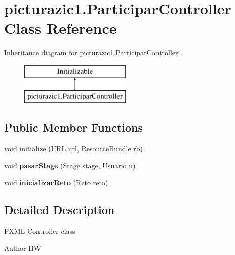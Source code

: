 \hypertarget{classpicturazic1_1_1_participar_controller}{}\section{picturazic1.\+Participar\+Controller Class Reference}
\label{classpicturazic1_1_1_participar_controller}
Inheritance diagram for picturazic1.\+Participar\+Controller\+:\begin{figure}[H]
\begin{center}
\leavevmode
\includegraphics[height=2.000000cm]{classpicturazic1_1_1_participar_controller}
\end{center}
\end{figure}
\subsection*{Public Member Functions}
\begin{DoxyCompactItemize}
\item 
void \mbox{\hyperlink{classpicturazic1_1_1_participar_controller_a73c5f79e43aa45114e7bd176d3839dac}{initialize}} (U\+RL url, Resource\+Bundle rb)
\item 
\mbox{\label{classpicturazic1_1_1_participar_controller_aa04fcd549667f6df333e31253a7fa026}} 
void {\bfseries pasar\+Stage} (Stage stage, \mbox{\hyperlink{classmodelo_1_1_usuario}{Usuario}} u)
\item 
\mbox{\label{classpicturazic1_1_1_participar_controller_aca507bdc034f9f52c346931a37faec33}} 
void {\bfseries inicializar\+Reto} (\mbox{\hyperlink{classmodelo_1_1_reto}{Reto}} reto)
\end{DoxyCompactItemize}


\subsection{Detailed Description}
F\+X\+ML Controller class

\begin{DoxyAuthor}{Author}
HW 
\end{DoxyAuthor}


